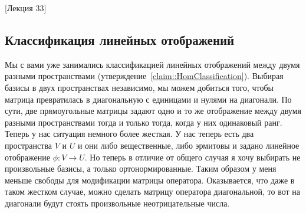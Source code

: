 [Лекция 33]


\subsection{Классификация линейных отображений}

Мы с вами уже занимались классификацией линейных отображений между двумя разными пространствами (утверждение~\ref{claim::HomClassification}).
Выбирая базисы в двух пространствах независимо, мы можем добиться того, чтобы матрица превратилась в диагональную с единицами и нулями на диагонали.
По сути, две прямоугольные матрицы задают одно и то же отображение между двумя разными пространствами тогда и только тогда, когда у них одинаковый ранг.
Теперь у нас ситуация немного более жесткая.
У нас теперь есть два пространства $V$ и $U$ и они либо вещественные, либо эрмитовы и задано линейное отображение $\phi\colon V\to U$.
Но теперь в отличие от общего случая я хочу выбирать не произвольные базисы, а только ортонормированные.
Таким образом у меня меньше свободы для модификации матрицы оператора.
Оказывается, что даже в таком жестком случае, можно сделать матрицу оператора диагональной, то вот на диагонали будут стоять произвольные неотрицательные числа.

